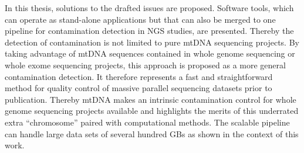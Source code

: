 In this thesis, solutions to the drafted issues are proposed. Software tools, which can operate as stand-alone applications but that can also be merged to one pipeline for contamination detection in NGS studies, are presented. Thereby the detection of contamination is not limited to pure mtDNA sequencing projects. By taking advantage of  mtDNA sequences contained in whole genome sequencing or whole exome sequencing projects, this approach is proposed as a more general contamination detection. It therefore represents a fast and straightforward method for quality control of massive parallel sequencing datasets prior to publication. Thereby mtDNA makes an intrinsic contamination control for whole genome sequencing projects available and highlights the merits of this underrated extra “chromosome” paired with computational methods. The scalable pipeline can handle large data sets of several hundred GBs as shown in the context of this work. 

